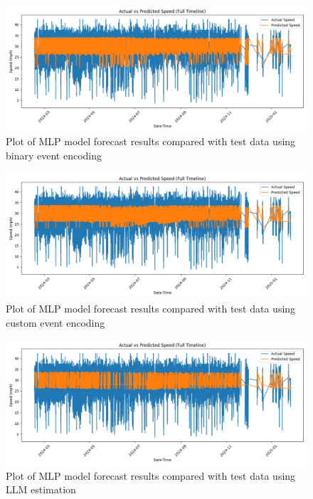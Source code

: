 \begin{figure}[!ht]
  \centering
  \includegraphics[width=\textwidth]{images/results-discussions/binary-events.pdf}
  \caption{Plot of MLP model forecast results compared with test data using binary event encoding}
  \label{fig:binary-events}
\end{figure}

\begin{figure}[!ht]
  \centering
  \includegraphics[width=\textwidth]{images/results-discussions/events.pdf}
  \caption{Plot of MLP model forecast results compared with test data using custom event encoding}
  \label{fig:events}
\end{figure}

\begin{figure}[!ht]
  \centering
  \includegraphics[width=\textwidth]{images/results-discussions/llm.pdf}
  \caption{Plot of MLP model forecast results compared with test data using LLM estimation}
  \label{fig:llm}
\end{figure}

